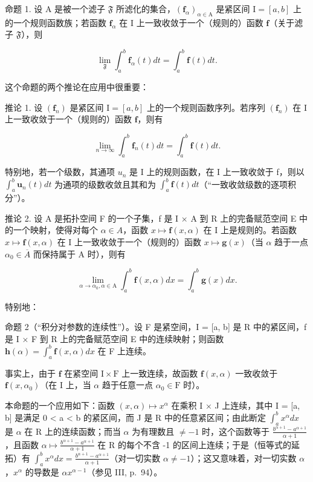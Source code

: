 命题 1. 设 A 是被一个滤子 \(\mathfrak{F}\) 所滤化的集合，\((\mathbf{f}_{\alpha})_{\alpha \in \mathrm{A}}\) 是紧区间 \(\mathrm{I} = [a, b]\) 上的一个规则函数族；若函数 \(\mathbf{f}_{\alpha}\) 在 I 上一致收敛于一个（规则的）函数 \(\mathbf{f}\)（关于滤子 \(\mathfrak{F}\)），则

\[
\lim _ {\mathfrak {F}} \int_ {a} ^ {b} \mathbf {f} _ {\alpha} (t) d t = \int_ {a} ^ {b} \mathbf {f} (t) d t.\tag{1}
\]

这个命题的两个推论在应用中很重要：

推论 1. 设 \((\mathbf{f}_n)\) 是紧区间 \(\mathrm{I} = [a, b]\) 上的一个规则函数序列。若序列 \((\mathbf{f}_n)\) 在 \(\mathrm{I}\) 上一致收敛于一个（规则的）函数 \(\mathbf{f}\)，则有

\[
\lim _ {n \rightarrow \infty} \int_ {a} ^ {b} \mathbf {f} _ {n} (t) d t = \int_ {a} ^ {b} \mathbf {f} (t) d t.\tag{2}
\]

特别地，若一个级数，其通项 \(u_{n}\) 是 I 上的规则函数，在 I 上一致收敛于 f，则以 \(\int_{a}^{b}\mathbf{u}_{n}(t)dt\) 为通项的级数收敛且其和为 \(\int_{a}^{b}\mathbf{f}(t)dt\)（“一致收敛级数的逐项积分”）。

推论 2. 设 A 是拓扑空间 F 的一个子集，f 是 I × A 到 R 上的完备赋范空间 E 中的一个映射，使得对每个 \(\alpha \in A\)，函数 \(x \mapsto \mathbf{f}(x, \alpha)\) 在 I 上是规则的。若函数 \(x \mapsto \mathbf{f}(x, \alpha)\) 在 I 上一致收敛于一个（规则的）函数 \(x \mapsto \mathbf{g}(x)\)（当 \(\alpha\) 趋于一点 \(\alpha_{0} \in \overline{A}\) 而保持属于 A 时），则有

\[
\lim _ {\alpha \rightarrow \alpha_ {0}, \alpha \in \mathrm{A}} \int_ {a} ^ {b} \mathbf {f} (x, \alpha) d x = \int_ {a} ^ {b} \mathbf {g} (x) d x.\tag{3}
\]

特别地：

命题 2（“积分对参数的连续性”）。设 F 是紧空间，I = {[}a, b{]} 是 R 中的紧区间，f 是 I × F 到 R 上的完备赋范空间 E 中的连续映射；则函数 \(\mathbf{h}(\alpha) = \int_{a}^{b} \mathbf{f}(x, \alpha) dx\) 在 F 上连续。

事实上，由于 \(\mathbf{f}\) 在紧空间 \(\mathrm{I} \times \mathrm{F}\) 上一致连续，故函数 \(\mathbf{f}(x, \alpha)\) 一致收敛于 \(\mathbf{f}(x, \alpha_0)\)（在 \(\mathrm{I}\) 上，当 \(\alpha\) 趋于任意一点 \(\alpha_0 \in \mathrm{F}\) 时）。

本命题的一个应用如下：函数 \((x, \alpha) \mapsto x^{\alpha}\) 在乘积 I × J 上连续，其中 I = {[}a, b{]} 是满足 0 \textless{} a \textless{} b 的紧区间，而 J 是 R 中的任意紧区间；由此断定 \(\int_{a}^{b} x^{\alpha} dx\) 是 \(\alpha\) 在 R 上的连续函数；而当 \(\alpha\) 为有理数且 \(\neq -1\) 时，这个函数等于 \(\frac{b^{\alpha+1} - a^{\alpha+1}}{\alpha + 1}\)，且函数 \(\alpha \mapsto \frac{b^{\alpha+1} - a^{\alpha+1}}{\alpha + 1}\) 在 R 的每个不含 -1 的区间上连续；于是（恒等式的延拓）有 \(\int_{a}^{b} x^{\alpha} dx = \frac{b^{\alpha+1} - a^{\alpha+1}}{\alpha + 1}\)（对一切实数 \(\alpha \neq -1\)）；这又意味着，对一切实数 \(\alpha\)，\(x^{\alpha}\) 的导数是 \(\alpha x^{\alpha-1}\)（参见 III, p.~94）。

